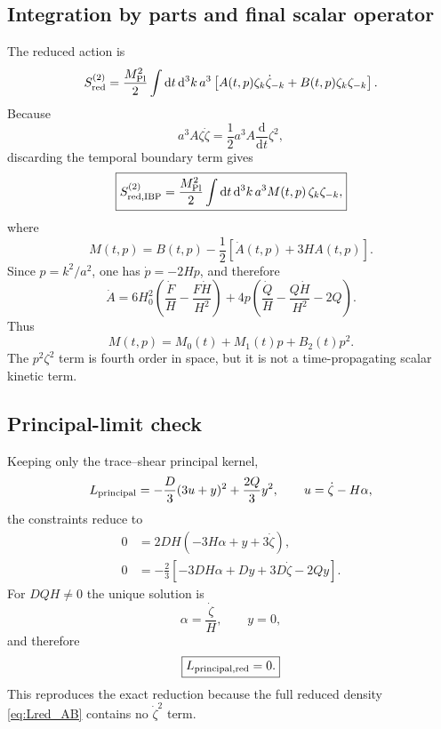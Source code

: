 \documentclass[11pt,a4paper]{article}
\renewcommand{\dd}{\mathrm{d}}
\newcommand{\mpl}{M_{\rm Pl}}
\newcommand{\Boxed}[1]{\boxed{\displaystyle #1}}
\begin{document}
\subsection{Integration by parts and final scalar operator}

The reduced action is
\begin{equation}
S_{\rm red}^{(2)}
=
\frac{\mpl^2}{2}
\int\dd t\,\dd^3k\,a^3
\left[
A(t,p)\zeta_k\dot\zeta_{-k}
+B(t,p)\zeta_k\zeta_{-k}
\right].
\label{eq:Sred_before_IBP}
\end{equation}
Because
\[
a^3A\zeta\dot\zeta
=
\frac12a^3A\frac{\dd}{\dd t}\zeta^2,
\]
discarding the temporal boundary term gives
\begin{equation}
\Boxed{
S_{\rm red,IBP}^{(2)}
=
\frac{\mpl^2}{2}
\int\dd t\,\dd^3k\,a^3
M(t,p)\,\zeta_k\zeta_{-k},
}
\label{eq:Sred_IBP}
\end{equation}
where
\begin{equation}
\Boxed{
M(t,p)=
B(t,p)
-\frac12\left[\dot A(t,p)+3HA(t,p)\right].
}
\label{eq:M_operator}
\end{equation}
Since \(p=k^2/a^2\), one has \(\dot p=-2Hp\), and therefore
\begin{equation}
\Boxed{
\dot A
=
6H_0^2
\left(
\frac{\dot F}{H}
-\frac{F\dot H}{H^2}
\right)
+4p
\left(
\frac{\dot Q}{H}
-\frac{Q\dot H}{H^2}
-2Q
\right).
}
\label{eq:Adot_exact}
\end{equation}
Thus
\begin{equation}
M(t,p)=M_0(t)+M_1(t)p+B_2(t)p^2 .
\label{eq:M_poly}
\end{equation}
The \(p^2\zeta^2\) term is fourth order in space, but it is not a time-propagating
scalar kinetic term.

\subsection{Principal-limit check}

Keeping only the trace--shear principal kernel,
\begin{equation}
L_{\rm principal}
=
-\frac{D}{3}(3u+y)^2+\frac{2Q}{3}y^2,
\qquad
u=\dot\zeta-H\alpha,
\label{eq:Lprincipal_scalar}
\end{equation}
the constraints reduce to
\begin{align}
0&=2DH(-3H\alpha+y+3\dot\zeta),\\
0&=-\frac23[-3DH\alpha+Dy+3D\dot\zeta-2Qy].
\end{align}
For \(DQH\neq0\) the unique solution is
\begin{equation}
\Boxed{
\alpha=\frac{\dot\zeta}{H},\qquad y=0,
}
\label{eq:principal_constraint_solution}
\end{equation}
and therefore
\begin{equation}
\Boxed{
L_{\rm principal,red}=0.
}
\label{eq:principal_reduced_zero}
\end{equation}
This reproduces the exact reduction because the full reduced density
\eqref{eq:Lred_AB} contains no \(\dot\zeta^2\) term.
\end{document}
